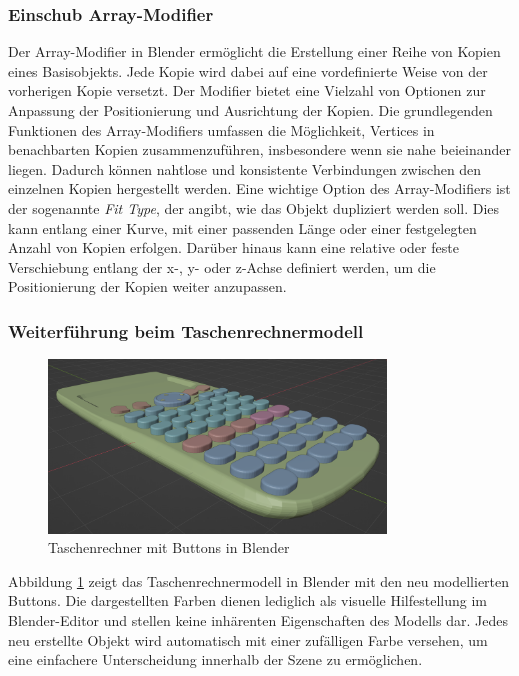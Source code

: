 \subsubsection*{Einschub Array-Modifier}
Der Array-Modifier in Blender ermöglicht die Erstellung einer Reihe von Kopien eines Basisobjekts. Jede Kopie wird dabei
auf eine vordefinierte Weise von der vorherigen Kopie versetzt. Der Modifier bietet eine Vielzahl von Optionen zur
Anpassung der Positionierung und Ausrichtung der Kopien.
Die grundlegenden Funktionen des Array-Modifiers umfassen die Möglichkeit, Vertices in benachbarten Kopien zusammenzuführen,
insbesondere wenn sie nahe beieinander liegen. Dadurch können nahtlose und konsistente Verbindungen zwischen den
einzelnen Kopien hergestellt werden.
Eine wichtige Option des Array-Modifiers ist der sogenannte \textit{Fit Type}, der angibt, wie das Objekt dupliziert
werden soll. Dies kann entlang einer Kurve, mit einer passenden Länge oder einer festgelegten Anzahl von Kopien erfolgen.
Darüber hinaus kann eine relative oder feste Verschiebung entlang der x-, y- oder z-Achse definiert werden, um die
Positionierung der Kopien weiter anzupassen.

\subsubsection*{Weiterführung beim Taschenrechnermodell}
\begin{figure}[H]
    \centering
    \includegraphics[width=0.8\textwidth]{images/taschenrechnermitbuttons.png}
    \caption{Taschenrechner mit Buttons in Blender}
    \label{fig:tcbuttons}
\end{figure}

Abbildung \ref{fig:tcbuttons} zeigt das Taschenrechnermodell in Blender mit den neu modellierten Buttons. Die
dargestellten Farben dienen lediglich als visuelle Hilfestellung im Blender-Editor und stellen keine inhärenten
Eigenschaften des Modells dar. Jedes neu erstellte Objekt wird automatisch mit einer zufälligen Farbe versehen, um eine
einfachere Unterscheidung innerhalb der Szene zu ermöglichen.

